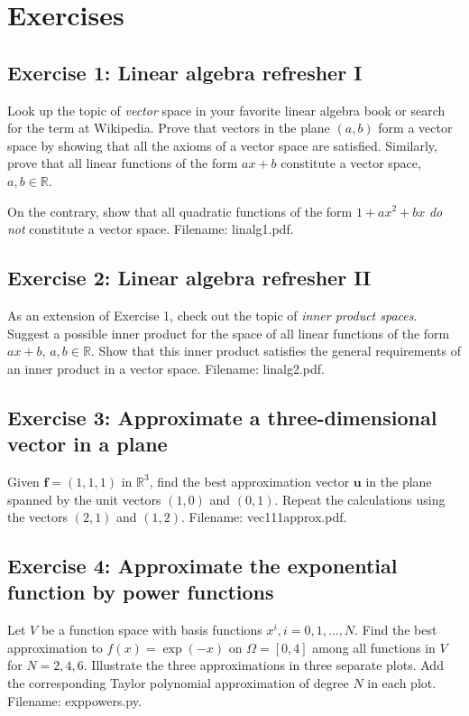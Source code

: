 \documentclass[../main.tex]{subfiles}
\begin{document}
\chapter{Exercises}
	\label{chap:chap_10}
	
	\section*{Exercise 1: Linear algebra refresher I}
	\label{sec:sec_10_1}
	\noindent Look up the topic of \textit{vector} space in your favorite linear algebra book or search for the term at Wikipedia. Prove that vectors in the plane $(a, b)$ form a vector space by showing that all the axioms of a vector space are satisfied. Similarly, prove that all linear functions of the form $a x+b$ constitute a vector space, $a, b \in \mathbb{R}$.
	
	On the contrary, show that all quadratic functions of the form $1+a x^{2}+b x$ \textit{do not} constitute a vector space. Filename: linalg1.pdf.
	\bigbreak
	\section*{Exercise 2: Linear algebra refresher II}
	\label{sec:sec_10_2}
	\noindent As an extension of Exercise 1, check out the topic of \textit{inner product spaces}. Suggest a possible inner product for the space of all linear functions of the form $a x+b$, $a, b \in \mathbb{R}$. Show that this inner product satisfies the general requirements of an inner product in a vector space. Filename: linalg2.pdf.
	\bigbreak
	\section*{Exercise 3: Approximate a three-dimensional vector in a plane}
	\label{sec:sec_10_3}
	\noindent Given $\boldsymbol{f}=(1,1,1)$ in $\mathbb{R}^{3}$, find the best approximation vector $\boldsymbol{u}$ in the plane spanned by the unit vectors $(1,0)$ and $(0,1)$. Repeat the calculations using the vectors $(2,1)$ and $(1,2)$. Filename: vec111\textunderscore approx.pdf.
	\bigbreak
	\section*{Exercise 4: Approximate the exponential function by power functions}
	\label{sec:sec_10_4}
	\noindent Let $V$ be a function space with basis functions $x^{i}, i=0,1, \ldots, N$. Find the best approximation to $f(x)=\exp (-x)$ on $\Omega=[0,4]$ among all functions in $V$ for $N=2,4,6$. Illustrate the three approximations in three separate plots. Add the corresponding Taylor polynomial approximation of degree $N$ in each plot. Filename: exp\textunderscore powers.py.
	\bigbreak
\end{document}
